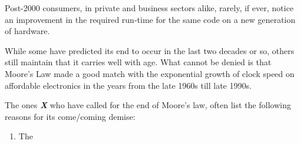 \documentclass[a4paper,12pt]{article}
\begin{document}
Post-2000 consumers, in private and business sectors alike, rarely, if ever, notice an improvement in the required run-time for the same code on a new generation of hardware.

While some have predicted its end to occur in the last two decades or so, others~\cite{Moore40,Moore50} still maintain that it carries well with age. What cannot be denied is that Moore's Law made a good match with the exponential growth of clock speed on affordable electronics in the years from the late 1960s till late 1990s.

The ones \textit{\textbf{X}} who have called for the end of Moore's law, often list the following reasons for its come/coming demise:

\begin{enumerate}[1)]
	\item The
\end{enumerate}

\clearpage


\end{document}
